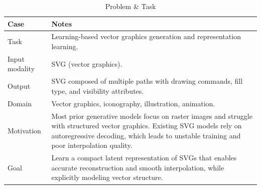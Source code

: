\begin{table}[h!]
\centering
\caption{Problem \& Task}
\begin{tabular}{|l|p{10cm}|}
\hline
\textbf{Case} & \textbf{Notes} \\ \hline
Task &
Learning-based vector graphics generation and representation learning. \\ \hline
Input modality &
SVG (vector graphics). \\ \hline
Output &
SVG composed of multiple paths with drawing commands, fill type, and visibility attributes. \\ \hline
Domain &
Vector graphics, iconography, illustration, animation. \\ \hline
Motivation &
Most prior generative models focus on raster images and struggle with structured vector graphics. Existing SVG models rely on autoregressive decoding, which leads to unstable training and poor interpolation quality. \\ \hline
Goal &
Learn a compact latent representation of SVGs that enables accurate reconstruction and smooth interpolation, while explicitly modeling vector structure. \\ \hline
\end{tabular}
\end{table}


